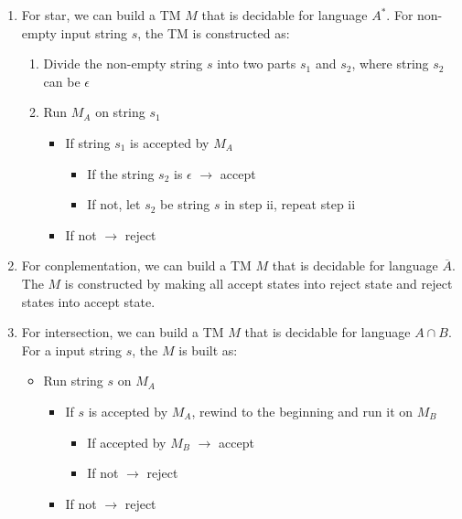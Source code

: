 \documentclass[11pt]{article}
\begin{document}
\begin{enumerate}
{\begin{enumerate}
\begin{itemize}
\begin{itemize}
            \item If $s_1$ is accepted by $M_A$, run string $s_2$ on $M_B$
            \begin{itemize}
                \item If $s_2$ accepted by $M_B$ $\to$ accept
                \item If not $\to$ reject
            \end{itemize}
            \item If not $\to$ reject
        \end{itemize}
    \end{itemize}
    \item For star, we can build a TM $M$ that is decidable for language $A^*$. For non-empty input string $s$, the TM is constructed as:
    \begin{enumerate}
        \item Divide the non-empty string $s$ into two parts $s_1$ and $s_2$, where string $s_2$ can be $\epsilon$
        \item Run $M_A$ on string $s_1$
        \begin{itemize}
            \item If string $s_1$ is accepted by $M_A$
            \begin{itemize}
                \item If the string $s_2$ is $\epsilon$ $\to$ accept
                \item If not, let $s_2$ be string $s$ in step ii, repeat step ii
            \end{itemize}
            \item If not $\to$ reject
        \end{itemize}
    \end{enumerate}
    \item For conplementation, we can build a TM $M$ that is decidable for language $\overline{A}$. The $M$ is constructed by making all accept states into reject state and reject states into accept state.
    \item For intersection, we can build a TM $M$ that is decidable for language $A \cap B$. For a input string $s$, the $M$ is built as:
    \begin{itemize}
        \item Run string $s$ on $M_A$
        \begin{itemize}
            \item If $s$ is accepted by $M_A$, rewind to the beginning and run it on $M_B$
            \begin{itemize}
                \item If accepted by $M_B$ $\to$ accept
                \item If not $\to$ reject
            \end{itemize}
            \item If not $\to$ reject
        \end{itemize}
    \end{itemize}
\end{enumerate}
}




\end{enumerate}
\end{document}
